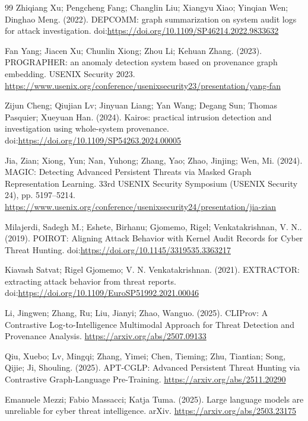 \documentclass[conference,a4paper,10pt]{IEEEtran}
\begin{document}
\balance
\begin{thebibliography}{99}
 Zhiqiang Xu; Pengcheng Fang; Changlin Liu; Xiangyu Xiao; Yinqian Wen; Dinghao Meng. (2022). DEPCOMM: graph summarization on system audit logs for attack investigation. doi:\url{https://doi.org/10.1109/SP46214.2022.9833632}

 Fan Yang; Jiacen Xu; Chunlin Xiong; Zhou Li; Kehuan Zhang. (2023). PROGRAPHER: an anomaly detection system based on provenance graph embedding. USENIX Security 2023. \url{https://www.usenix.org/conference/usenixsecurity23/presentation/yang-fan}

 Zijun Cheng; Qiujian Lv; Jinyuan Liang; Yan Wang; Degang Sun; Thomas Pasquier; Xueyuan Han. (2024). Kairos: practical intrusion detection and investigation using whole-system provenance. doi:\url{https://doi.org/10.1109/SP54263.2024.00005}

 Jia, Zian; Xiong, Yun; Nan, Yuhong; Zhang, Yao; Zhao, Jinjing; Wen, Mi. (2024). MAGIC: Detecting Advanced Persistent Threats via Masked Graph Representation Learning. 33rd USENIX Security Symposium (USENIX Security 24), pp. 5197–5214. \url{https://www.usenix.org/conference/usenixsecurity24/presentation/jia-zian}

 Milajerdi, Sadegh M.; Eshete, Birhanu; Gjomemo, Rigel; Venkatakrishnan, V. N.. (2019). POIROT: Aligning Attack Behavior with Kernel Audit Records for Cyber Threat Hunting. doi:\url{https://doi.org/10.1145/3319535.3363217}

 Kiavash Satvat; Rigel Gjomemo; V. N. Venkatakrishnan. (2021). EXTRACTOR: extracting attack behavior from threat reports. doi:\url{https://doi.org/10.1109/EuroSP51992.2021.00046}

 Li, Jingwen; Zhang, Ru; Liu, Jianyi; Zhao, Wanguo. (2025). CLIProv: A Contrastive Log-to-Intelligence Multimodal Approach for Threat Detection and Provenance Analysis. \url{https://arxiv.org/abs/2507.09133}

 Qiu, Xuebo; Lv, Mingqi; Zhang, Yimei; Chen, Tieming; Zhu, Tiantian; Song, Qijie; Ji, Shouling. (2025). APT-CGLP: Advanced Persistent Threat Hunting via Contrastive Graph-Language Pre-Training. \url{https://arxiv.org/abs/2511.20290}

 Emanuele Mezzi; Fabio Massacci; Katja Tuma. (2025). Large language models are unreliable for cyber threat intelligence. arXiv. \url{https://arxiv.org/abs/2503.23175}


\end{thebibliography}
\end{document}
